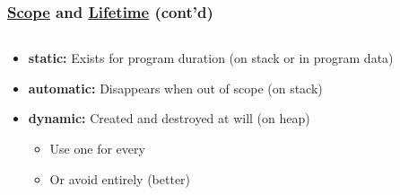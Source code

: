 \documentclass[glossy]{beamer}
\newcommand{\cppref}[2]{\href{http://en.cppreference.com/w/cpp/#1}{\underline{#2}}}
\newcommand{\refer}[1]{([shift={(.25em,.25em)}]pic cs:#1)}
\begin{document}
\begin{frame}[fragile=singleslide]
  \frametitle{\cppref{language/scope}{Scope} and \cppref{language/lifetime}{Lifetime} (cont'd)}
  \begin{columns}
    \begin{column}{6cm}
      \begin{itemize}
        \item \textbf{static:} Exists for program duration (on stack or in program data)
        \item \textbf{automatic:} Disappears when out of scope (on stack)
        \item \textbf{dynamic:} Created and destroyed at will (on heap)
        \begin{itemize}
          \item Use one  for every 
          \item Or avoid  entirely (better)
        \end{itemize}
      \end{itemize}
    \end{column}

    \begin{column}{6cm}
    \end{column}
  \end{columns}

\end{frame}

\end{document}
